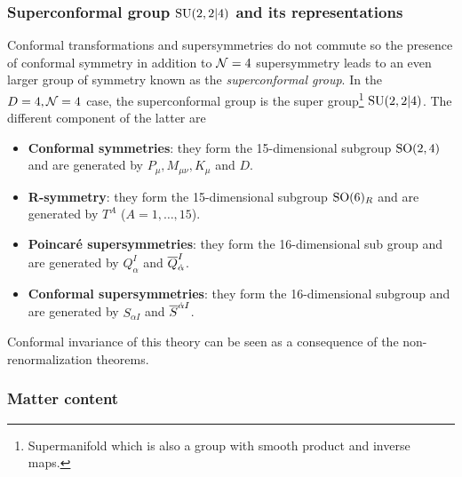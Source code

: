         \subsubsection{Superconformal group $\text{SU}(2,2|4)$ and its representations}

            Conformal transformations and supersymmetries do not commute so the presence of conformal symmetry in addition to $\mathcal{N}=4$ supersymmetry leads to an even larger group of symmetry known as the \emph{superconformal group}. In the $D=4,\mathcal{N}=4$ case, the superconformal group is the super group\footnote{Supermanifold which is also a group with smooth product and inverse maps.} $\text{SU}(2,2|4)$. The different component of the latter are
            \begin{itemize}
                \item \textbf{Conformal symmetries}: they form the 15-dimensional subgroup $\text{SO}(2,4)$ and are generated by $P_\mu,M_{\mu\nu},K_\mu$ and $D$.
                \item \textbf{R-symmetry}: they form the 15-dimensional subgroup $\text{SO}(6)_R$ and are generated by $T^A$ ($A=1,\dots,15$).
                \item \textbf{Poincaré supersymmetries}: they form the 16-dimensional sub group  and are generated by $Q^I_\alpha$ and $\overline{Q}^I_{\dot{\alpha}}$.
                \item \textbf{Conformal supersymmetries}: they form the 16-dimensional subgroup  and are generated by $S_{\alpha I}$ and $\overline{S}^{\dot{\alpha} I}$.
            \end{itemize}

            Conformal invariance of this theory can be seen as a consequence of the non-renormalization theorems.

        \subsubsection{Matter content}
            
